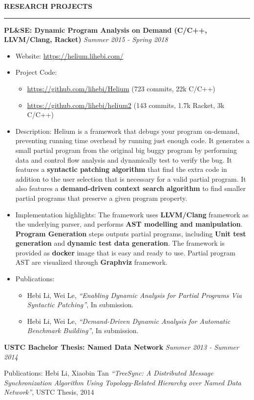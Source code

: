 \documentclass[10pt,letterpaper]{article}
\newenvironment{mysection}[1]{ %
  \medskip
  \MakeUppercase{\bf #1}
  \medskip
  \hrule
  \begin{list}{}{
      \setlength{\leftmargin}{1.5em}
    }
  \item[]
}{
  \end{list}
}
\begin{document}
\begin{mysection}{Research Projects}
  \textbf{PL\&SE: Dynamic Program Analysis on Demand (C/C++, LLVM/Clang,
    Racket)} \hfill \emph{Summer 2015 - Spring 2018}

  \begin{itemize}
  \item Website: \url{https://helium.lihebi.com/}
  \item Project Code:
    \begin{itemize}
    \item \url{https://github.com/lihebi/Helium} (723 commits, 22k C/C++)
    \item \url{https://github.com/lihebi/helium2} (143 commits, 1.7k
      Racket, 3k C/C++)
    \end{itemize}
  \item Description: Helium is a framework that debugs your program
    on-demand, preventing running time overhead by running just enough
    code. It generates a small partial program from the original big
    buggy program by performing data and control flow analysis and
    dynamically test to verify the bug.  It features a
    \textbf{syntactic patching algorithm} that find the extra code in
    addition to the user selection that is necessary for a valid
    partial program. It also features a \textbf{demand-driven context
      search algorithm} to find smaller partial programs that preserve
    a given program property.
  \item Implementation highlights: The framework uses
    \textbf{LLVM/Clang} framework as the underlying parser, and
    performs \textbf{AST modelling and manipulation}. \textbf{Program
      Generation} steps outputs partial programs, including
    \textbf{Unit test generation} and \textbf{dynamic test data
      generation}. The framework is provided as \textbf{docker} image
    that is easy and ready to use. Partial program AST are visualized
    through \textbf{Graphviz} framework.
  \item Publications:
    \begin{itemize}
    \item Hebi Li, Wei Le, \textit{``Enabling Dynamic Analysis for
      Partial Programs Via Syntactic Patching''}, In submission.
    \item Hebi Li, Wei Le, \textit{``Demand-Driven Dynamic Analysis
      for Automatic Benchmark Building''}, In submission.
    \end{itemize}
  \end{itemize}

  \textbf{USTC Bachelor Thesis: Named Data Network} \hfill
  \emph{Summer 2013 - Summer 2014}

  Publications: Hebi Li, Xiaobin Tan \textit{``TreeSync: A Distributed
    Message Synchronization Algorithm Using Topology-Related Hierarchy
    over Named Data Network''}, USTC Thesis, 2014
\end{mysection}
\end{document}
